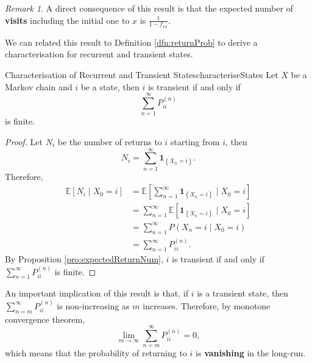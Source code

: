 \documentclass[math, code]{amznotes}
\theoremstyle{remark}
\newtheorem*{remark}{Remark}
\begin{document}
\begin{notebox}
    \begin{remark}
        A direct consequence of this result is that the expected number of \textbf{visits} including the initial one to $x$ is $\frac{1}{1 - f_{xx}}$.
    \end{remark}
\end{notebox}
We can related this result to Definition \ref{dfn:returnProb} to derive a characterisation for recurrent and transient states.
\begin{probox}{Characterisation of Recurrent and Transient States}{characteriseStates}
    Let $X$ be a Markov chain and $i$ be a state, then $i$ is transient if and only if 
    \begin{equation*}
        \sum_{n = 1}^{\infty}P^{\left(n\right)}_{ii}
    \end{equation*}
    is finite.
    \tcblower
    \begin{proof}
        Let $N_i$ be the number of returns to $i$ starting from $i$, then
        \begin{equation*}
            N_i = \sum_{n = 1}^{\infty}\mathbf{1}_{\left\{X_n = i\right\}}.
        \end{equation*}
        Therefore, 
        \begin{align*}
            \mathbb{E}\left[N_i \mid X_0 = i\right] & = \mathbb{E}\left[\sum_{n = 1}^{\infty}\mathbf{1}_{\left\{X_n = i\right\}} \mid X_0 = i\right] \\
            & = \sum_{n = 1}^{\infty}\mathbb{E}\left[\mathbf{1}_{\left\{X_n = i\right\}} \mid X_0 = i\right] \\
            & = \sum_{n = 1}^{\infty}P\left(X_n = i \mid X_0 = i\right) \\
            & = \sum_{n = 1}^{\infty}P^{\left(n\right)}_{ii}.
        \end{align*}
        By Proposition \ref{pro:expectedReturnNum}, $i$ is transient if and only if $\sum_{n = 1}^{\infty}P^{\left(n\right)}_{ii}$ is finite.
    \end{proof}
\end{probox}
An important implication of this result is that, if $i$ is a transient state, then $\sum_{n = m}^{\infty}P^{\left(n\right)}_{ii}$ is non-increasing as $m$ increases. Therefore, by monotone convergence theorem, 
\begin{equation*}
    \lim_{m \to \infty}\sum_{n = m}^{\infty}P^{\left(n\right)}_{ii} = 0,
\end{equation*}
which means that the probability of returning to $i$ is \textbf{vanishing} in the long-run.
\end{document}
